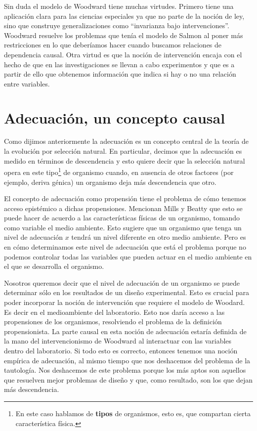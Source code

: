 Sin duda el modelo de Woodward tiene muchas virtudes. Primero tiene una aplicación clara para las ciencias especiales ya que no parte de la noción de ley, sino que construye generalizaciones como ``invarianza bajo intervenciones''. Woodward resuelve los problemas que tenía el modelo de Salmon al poner más restricciones en lo que deberíamos hacer cuando buscamos relaciones de dependencia causal. Otra virtud es que la noción de intervención encaja con el hecho de que en las investigaciones se llevan a cabo experimentos y que es a partir de ello que obtenemos información que indica si hay o no una relación entre variables.

\section{Adecuación, un concepto causal}

\noindent Como dijimos anteriormente la adecuación es un concepto central de la teoría de la evolución por selección natural. En particular, decimos que la adecuación es medido en términos de descendencia y esto quiere decir que la selección natural opera en este tipo\footnote{En este caso hablamos de \textbf{tipos} de organismos, esto es, que compartan cierta característica física.} de organismo cuando, en ausencia de otros factores (por ejemplo, deriva génica) un organismo deja más descendencia que otro.

El concepto de adecuación como propensión tiene el problema de cómo tenemos acceso epistémico a dichas propensiones. Mencionan Mills y Beatty \citeyear{Mills1979} que esto se puede hacer de acuerdo a las características físicas de un organismo, tomando como variable el medio ambiente. Esto sugiere que un organismo que tenga un nivel de adecuación $x$ tendrá un nivel diferente en otro medio ambiente. Pero es en cómo determinamos este nivel de adecuación que está el problema porque no podemos controlar todas las variables que pueden actuar en el medio ambiente en el que se desarrolla el organismo.

 Nosotros queremos decir que el nivel de adecuación de un organismo se puede determinar sólo en los resultados de un diseño experimental. Esto es crucial para poder incorporar la noción de intervención que requiere el modelo de Woodard. Es decir en el medioambiente del laboratorio. Esto nos daría acceso a las propensiones de los organismos, resolviendo el problema de la definición propensionista. La parte causal en esta noción de adecuación estaría definida de la mano del intervencionismo de Woodward al interactuar con las variables dentro del laboratorio. Si todo esto es correcto, entonces tenemos una noción empírica de adecuación, al mismo tiempo que nos deshacemos del problema de la tautología. Nos deshacemos de este problema porque los más aptos son aquellos que resuelven mejor problemas de diseño y que, como resultado, son los que dejan más descendencia.

